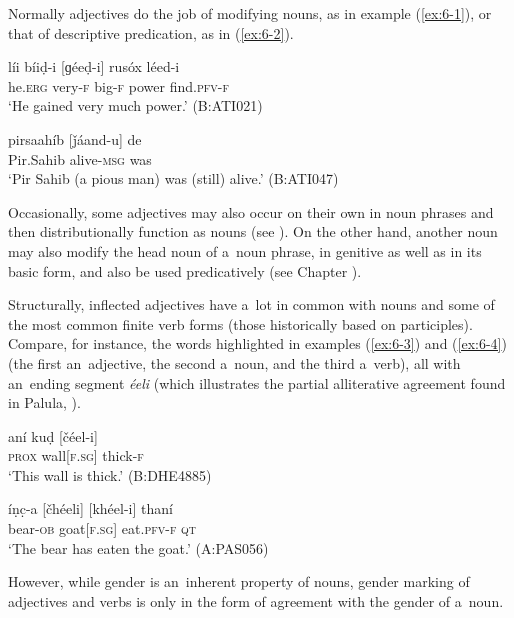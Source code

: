 Normally adjectives do the job of modifying nouns, as in example (\ref{ex:6-1}), or that of descriptive predication, as in (\ref{ex:6-2}).

\begin{exe}
\ex
\label{ex:6-1}
\gll líi bíiḍ-i [ɡéeḍ-i] rusóx léed-i \\
he.\textsc{erg} very-\textsc{f} big-\textsc{f} power find.\textsc{pfv-f} \\
\glt `He gained very much power.' (B:ATI021)

\ex
\label{ex:6-2}
\gll pirsaahíb [ǰáand-u] de \\
Pir.Sahib alive-\textsc{msg} was  \\
\glt `Pir Sahib (a pious man) was (still) alive.' (B:ATI047)
\end{exe}

Occasionally, some adjectives may also occur on their own in noun phrases and then distributionally function as nouns (see ). On the other hand, another noun may also modify the head noun of a~noun phrase, in genitive as well as in its basic form, and also be used predicatively (see Chapter ).


Structurally, inflected adjectives have a~lot in common with nouns and some of the most common finite verb forms (those historically based on participles). Compare, for instance, the words highlighted in examples (\ref{ex:6-3}) and (\ref{ex:6-4}) (the first an~adjective, the second a~noun, and the third a~verb), all with an~ending segment \textit{éeli} (which illustrates the partial alliterative agreement found in Palula, \citealt[87--88]{corbett2006}).

\begin{exe}
\ex
\label{ex:6-3}
\gll aní kuḍ [čéel-i] \\
\textsc{prox} wall[\textsc{f.sg}] thick-\textsc{f} \\
\glt `This wall is thick.' (B:DHE4885)

\ex
\label{ex:6-4}
\gll íṇc̣-a [čhéeli] [khéel-i] thaní \\
bear-\textsc{ob} goat[\textsc{f.sg}] eat.\textsc{pfv-f} \textsc{qt} \\
\glt `The bear has eaten the goat.' (A:PAS056)
\end{exe}

However, while gender is an~inherent property of nouns, gender marking of adjectives and verbs is only in the form of agreement with the gender of a~noun. 



